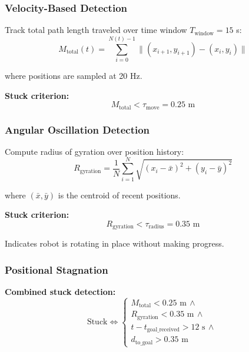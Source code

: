 \subsubsection{Velocity-Based Detection}

Track total path length traveled over time window $T_{\text{window}} = 15$ s:
\begin{equation}
M_{\text{total}}(t) = \sum_{i=0}^{N(t)-1} \|(x_{i+1}, y_{i+1}) - (x_i, y_i)\|
\label{eq:total_movement}
\end{equation}

where positions are sampled at 20 Hz.

\textbf{Stuck criterion:}
\begin{equation}
M_{\text{total}} < \tau_{\text{move}} = 0.25 \text{ m}
\label{eq:stuck_velocity}
\end{equation}

\subsubsection{Angular Oscillation Detection}

Compute radius of gyration over position history:
\begin{equation}
R_{\text{gyration}} = \frac{1}{N} \sum_{i=1}^{N} \sqrt{(x_i - \bar{x})^2 + (y_i - \bar{y})^2}
\label{eq:radius_gyration}
\end{equation}

where $(\bar{x}, \bar{y})$ is the centroid of recent positions.

\textbf{Stuck criterion:}
\begin{equation}
R_{\text{gyration}} < \tau_{\text{radius}} = 0.35 \text{ m}
\label{eq:stuck_angular}
\end{equation}

Indicates robot is rotating in place without making progress.

\subsubsection{Positional Stagnation}

\textbf{Combined stuck detection:}
\begin{equation}
\text{Stuck} \iff \begin{cases}
M_{\text{total}} < 0.25 \text{ m} \, \land \\
R_{\text{gyration}} < 0.35 \text{ m} \, \land \\
t - t_{\text{goal\_received}} > 12 \text{ s} \, \land \\
d_{\text{to\_goal}} > 0.35 \text{ m}
\end{cases}
\label{eq:stuck_combined}
\end{equation}

